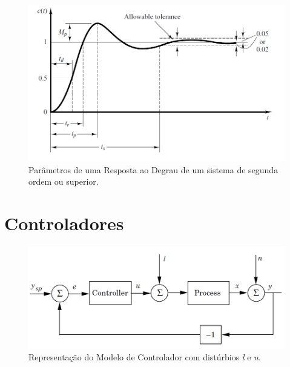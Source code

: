 \begin{figure}[htb]
  \caption{Parâmetros de uma Resposta ao Degrau de um sistema de segunda ordem ou superior.}
  \begin{center}
      \includegraphics[scale=0.5]{img/transient_ogata_p170}
  \end{center}
  \label{fig:transient_ogata_p170}
\end{figure}

\section{Controladores}

\begin{figure}[htb]
  \caption{Representação do Modelo de Controlador com distúrbios \textit{l} e \textit{n}.}
  \begin{center}
      \includegraphics[scale=0.65]{img/feedback_loop_astrom_p65}
  \end{center}
  \label{fig:feedback_loop_astrom_p65}
\end{figure}

